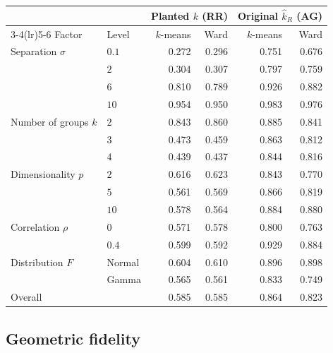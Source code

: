 \documentclass[pdflatex,sn-basic]{sn-jnl}
\providecommand{\DIFaddbeginFL}{} %
\providecommand{\DIFaddendFL}{} %
\providecommand{\DIFdelendFL}{} %
\newcommand{\DIFaddincludegraphics}[2][]{{\color{blue}\fbox{\DIFOincludegraphics[#1]{#2}}}} %
\DeclareRobustCommand{\DIFaddbeginFL}{\DIFOaddbeginFL \let\includegraphics\DIFaddincludegraphics} %
\DeclareRobustCommand{\DIFaddendFL}{\DIFOaddendFL \let\includegraphics\DIFOincludegraphics} %
\DeclareRobustCommand{\DIFdelendFL}{\DIFOaddendFL \let\includegraphics\DIFOincludegraphics} %
\begin{document}
\begin{table}[t]
\DIFdelendFL \DIFaddbeginFL \begin{tabular}{llrrrr}
\toprule
 & & \multicolumn{2}{c}{Planted $k$ (RR)} & \multicolumn{2}{c}{Original $\hat{k}_R$ (AG)} \\
\cmidrule(lr){3-4}\cmidrule(lr){5-6}
Factor & Level & $k$-means & Ward & $k$-means & Ward \\
\midrule
Separation $\sigma$ & $0.1$   & 0.272 & 0.296 & 0.751 & 0.676 \\
                    & $2$     & 0.304 & 0.307 & 0.797 & 0.759 \\
                    & $6$     & 0.810 & 0.789 & 0.926 & 0.882 \\
                    & $10$    & 0.954 & 0.950 & 0.983 & 0.976 \\
\addlinespace
Number of groups $k$ & $2$    & 0.843 & 0.860 & 0.885 & 0.841 \\
                     & $3$    & 0.473 & 0.459 & 0.863 & 0.812 \\
                     & $4$    & 0.439 & 0.437 & 0.844 & 0.816 \\
\addlinespace
Dimensionality $p$ & $2$      & 0.616 & 0.623 & 0.843 & 0.770 \\
                   & $5$      & 0.561 & 0.569 & 0.866 & 0.819 \\
                   & $10$     & 0.578 & 0.564 & 0.884 & 0.880 \\
\addlinespace
Correlation $\rho$ & $0$      & 0.571 & 0.578 & 0.800 & 0.763 \\
                   & $0.4$    & 0.599 & 0.592 & 0.929 & 0.884 \\
\addlinespace
Distribution $F$ & Normal     & 0.604 & 0.610 & 0.896 & 0.898 \\
                 & Gamma      & 0.565 & 0.561 & 0.833 & 0.749 \\
\midrule
Overall & & 0.585 & 0.585 & 0.864 & 0.823 \\
\bottomrule
\end{tabular}
\DIFaddendFL \end{table}

\subsection{Geometric fidelity}
\end{document}
